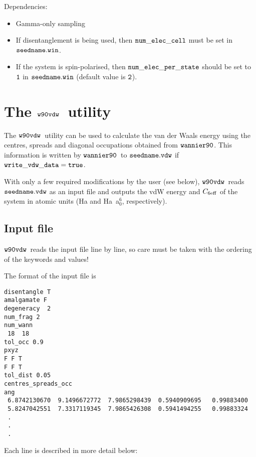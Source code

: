 \documentclass{report}
\newcommand{\wvdw}{{$\tt{w90vdw}$}}
\newcommand{\wannier}{{$\tt{wannier90}$}}
\begin{document}
Dependencies: 
\begin{itemize}
\item Gamma-only sampling
\item If disentanglement is being used, then $\tt{num\_elec\_cell}$
  must be set in $\tt{seedname.win}$.
\item If the system is spin-polarised, then
  $\tt{num\_elec\_per\_state}$ should be set to $\tt{1}$ in
  $\tt{seedname.win}$ (default value is $\tt{2}$).
\end{itemize}


\section{The \wvdw\ utility}
The \wvdw\ utility can be used to calculate the van der Waals energy
using the centres, spreads and diagonal occupations obtained from
\wannier. This information is written by \wannier\ to
$\tt{seedname.vdw}$ if $\tt{write\_vdw\_data = true}$. 
 
With only a few required modifications by the user (see below),
\wvdw\ reads $\tt{seedname.vdw}$ as an input file and outputs 
the vdW energy and $C_{6\rm {eff}}$ of the system in atomic units (Ha
and Ha~a$_0^6$, respectively).

\subsection{Input file}

\wvdw\ reads the input file line by line, so care must be taken with
the ordering of the keywords and values! 

The format of the input file is

\begin{verbatim}
disentangle T
amalgamate F
degeneracy  2
num_frag 2
num_wann
 18  18
tol_occ 0.9
pxyz
F F T
F F T
tol_dist 0.05
centres_spreads_occ
ang
 6.8742130670  9.1496672772  7.9865298439  0.5940909695   0.99883400
 5.8247042551  7.3317119345  7.9865426308  0.5941494255   0.99883324
 .
 .
 .
\end{verbatim}

Each line is described in more detail below:
\end{document}
